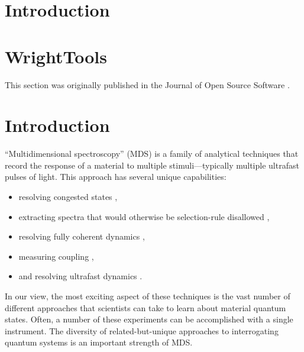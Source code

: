 
\clearpage

\section{Introduction}  %

\clearpage

\section{WrightTools}  %

This section was originally published in the Journal of Open Source Software \cite{ThompsonBlaiseJonathan2019a}.

\hypertarget{introduction}{%
\section{Introduction}\label{introduction}}

``Multidimensional spectroscopy'' (MDS) is a family of analytical
techniques that record the response of a material to multiple
stimuli---typically multiple ultrafast pulses of light. This approach
has several unique capabilities:

\begin{itemize}
\tightlist
\item
	resolving congested states \cite{ZhaoWei1999b}\cite{DonaldsonPaulMurray2008a},
\item
  extracting spectra that would otherwise be selection-rule disallowed
		\cite{BoyleErinSelene2013b}\cite{BoyleErinSelene2014a},
\item
  resolving fully coherent dynamics \cite{PakoulevAndreiV2009a},
\item
  measuring coupling \cite{WrightJohnCurtis2011a},
\item
	and resolving ultrafast dynamics \cite{SmallwoodChristopherL2018a}\cite{CzechKyleJonathan2015a}.
\end{itemize}

In our view, the most exciting aspect of these techniques is the vast
number of different approaches that scientists can take to learn about
material quantum states. Often, a number of these experiments can be
accomplished with a single instrument. The diversity of
related-but-unique approaches to interrogating quantum systems is an
important strength of MDS.

